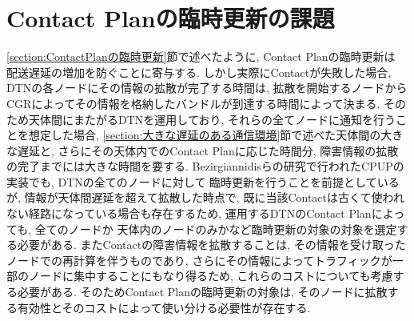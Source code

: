 \section{Contact Planの臨時更新の課題}
\label{section:ContactPlanの臨時更新の課題}
\ref{section:ContactPlanの臨時更新}節で述べたように, Contact Planの臨時更新は
配送遅延の増加を防ぐことに寄与する.  
しかし実際にContactが失敗した場合, DTNの各ノードにその情報の拡散が完了する時間は, 
拡散を開始するノードからCGRによってその情報を格納したバンドルが到達する時間によって決まる.  
そのため天体間にまたがるDTNを運用しており, それらの全てノードに通知を行うことを想定した場合, 
\ref{section:大きな遅延のある通信環境}節で述べた天体間の大きな遅延と, 
さらにその天体内でのContact Planに応じた時間分, 障害情報の拡散の完了までには大きな時間を要する.  
Bezirgiannidisらの研究で行われたCPUPの実装でも, DTNの全てのノードに対して
臨時更新を行うことを前提としているが, 情報が天体間遅延を超えて拡散した時点で, 
既に当該Contactは古くて使われない経路になっている場合も存在するため, 
運用するDTNのContact Planによっても, 全てのノードか
天体内のノードのみかなど臨時更新の対象の対象を選定する必要がある.  
またContactの障害情報を拡散することは, その情報を受け取ったノードでの再計算を伴うものであり, 
さらにその情報によってトラフィックが一部のノードに集中することにもなり得るため, 
これらのコストについても考慮する必要がある.  
そのためContact Planの臨時更新の対象は, そのノードに拡散する有効性とそのコストによって使い分ける必要性が存在する.  